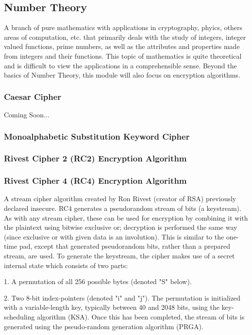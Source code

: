 \documentclass[12pt, letterpaper]{article}
\begin{document}
\begin{sloppypar}
\begin{flushleft}
\subsection{Number Theory}
A branch of pure mathematics with applications in cryptography, phyics, others areas of 
computation, etc. that primarily deals with the study of integers, integer valued functions, 
prime numbers, as well as the attributes and properties made from integers and their functions. 
This topic of mathematics is quite theoretical and is difficult to view the applications in a 
comprehensible sense. Beyond the basics of Number Theory, this module will also focus on 
encryption algorithms.

\subsubsection{Caesar Cipher}
Coming Soon...

\subsubsection{Monoalphabetic Substitution Keyword Cipher}
\subsubsection{Rivest Cipher 2 (RC2) Encryption Algorithm}
\subsubsection{Rivest Cipher 4 (RC4) Encryption Algorithm}
A stream cipher algorithm created by Ron Rivest (creator of RSA) previously declared 
insecure. RC4 generates a pseudorandom stream of bits (a keystream). As with any stream 
cipher, these can be used for encryption by combining it with the plaintext using bitwise 
exclusive or; decryption is performed the same way (since exclusive or with given data is 
an involution). This is similar to the one-time pad, except that generated pseudorandom 
bits, rather than a prepared stream, are used. To generate the keystream, the cipher makes 
use of a secret internal state which consists of two parts:

\item 1. A permutation of all 256 possible bytes (denoted "S" below).
\item 2. Two 8-bit index-pointers (denoted "i" and "j").
The permutation is initialized with a variable-length key, typically between 40 and 2048 
bits, using the key-scheduling algorithm (KSA). Once this has been completed, the stream 
of bits is generated using the pseudo-random generation algorithm (PRGA).


\end{flushleft}
\end{sloppypar}
\end{document}
